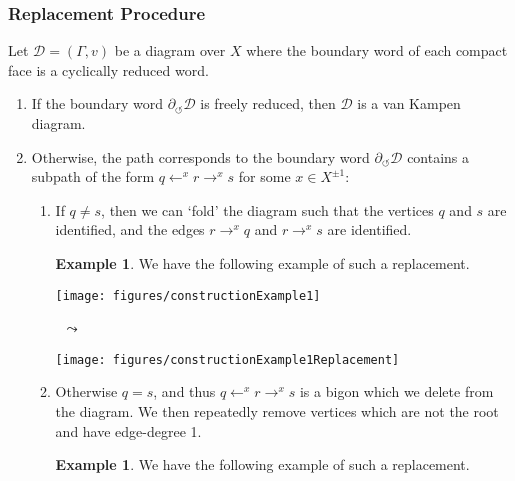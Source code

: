 \documentclass[11pt,a4paper,reqno]{amsart}
\theoremstyle{plain}
\theoremstyle{definition}
\theoremstyle{definition}
\newtheorem{example}[theorem]{Example}
\begin{document}
\subsubsection{Replacement Procedure}
Let $\mathcal D = (\Gamma, v)$ be a diagram over $X$ where the boundary word of each compact face is a cyclically reduced word.
\begin{enumerate}
  \item If the boundary word $\partial_{\circlearrowleft}\mathcal D$ is freely reduced, then $\mathcal D$ is a van Kampen diagram.
  \item Otherwise, the path corresponds to the boundary word $\partial_{\circlearrowleft}\mathcal D$ contains a subpath of the form $q \leftarrow^{x} r \to^x s$ for some $x\in X^{\pm 1}$:
    \begin{enumerate}
      \item If $q \neq s$, then we can `fold' the diagram such that the vertices $q$ and $s$ are identified, and the edges $r \to^x q$ and $r \to^x s$ are identified.

        \smallskip

        \begin{example}
          We have the following example of such a replacement.

          \smallskip

          \begin{center}
          \begin{minipage}{.4\linewidth}
            \centering
            \texttt{[image: figures/constructionExample1]}%
          \end{minipage}
          ~{\Large$\leadsto$}~
          \begin{minipage}{.4\linewidth}
            \centering
            \texttt{[image: figures/constructionExample1Replacement]}%
          \end{minipage}
          \end{center}
        
        \end{example}
        
        \smallskip

      \item Otherwise $q = s$, and thus $q \leftarrow^{x} r \to^x s$ is a bigon which we delete from the diagram.
        We then repeatedly remove vertices which are not the root and have edge-degree 1.

        \smallskip

        \begin{example}
          We have the following example of such a replacement.


\end{example}
\end{enumerate}
\end{enumerate}
\end{document}
